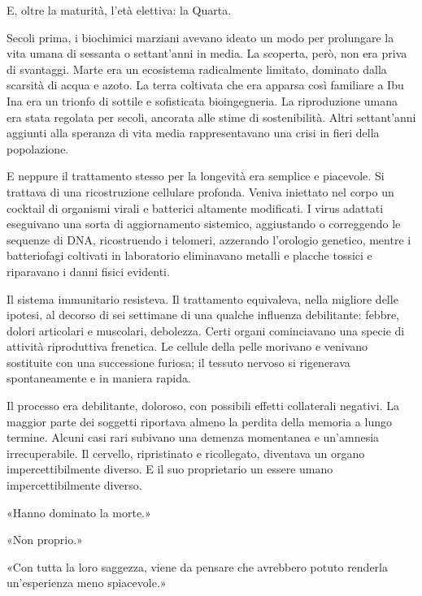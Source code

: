 E, oltre la maturità, l'età elettiva: la Quarta.

Secoli prima, i biochimici marziani avevano ideato un modo per
prolungare la vita umana di sessanta o settant'anni in media. La
scoperta, però, non era priva di svantaggi. Marte era un ecosistema
radicalmente limitato, dominato dalla scarsità di acqua e azoto. La
terra coltivata che era apparsa così familiare a Ibu Ina era un trionfo
di sottile e sofisticata bioingegneria. La riproduzione umana era stata
regolata per secoli, ancorata alle stime di sostenibilità. Altri
settant'anni aggiunti alla speranza di vita media rappresentavano una
crisi in fieri della popolazione.

E neppure il trattamento stesso per la longevità era semplice e
piacevole. Si trattava di una ricostruzione cellulare profonda. Veniva
iniettato nel corpo un cocktail di organismi virali e batterici
altamente modificati. I virus adattati eseguivano una sorta di
aggiornamento sistemico, aggiustando o correggendo le sequenze di DNA,
ricostruendo i telomeri, azzerando l'orologio genetico, mentre i
batteriofagi coltivati in laboratorio eliminavano metalli e placche
tossici e riparavano i danni fisici evidenti.

Il sistema immunitario resisteva. Il trattamento equivaleva, nella
migliore delle ipotesi, al decorso di sei settimane di una qualche
influenza debilitante: febbre, dolori articolari e muscolari, debolezza.
Certi organi cominciavano una specie di attività riproduttiva frenetica.
Le cellule della pelle morivano e venivano sostituite con una
successione furiosa; il tessuto nervoso si rigenerava spontaneamente e
in maniera rapida.

Il processo era debilitante, doloroso, con possibili effetti collaterali
negativi. La maggior parte dei soggetti riportava almeno la perdita
della memoria a lungo termine. Alcuni casi rari subivano una demenza
momentanea e un'amnesia irrecuperabile. Il cervello, ripristinato e
ricollegato, diventava un organo impercettibilmente diverso. E il suo
proprietario un essere umano impercettibilmente diverso.

«Hanno dominato la morte.»

«Non proprio.»

«Con tutta la loro saggezza, viene da pensare che avrebbero potuto
renderla un'esperienza meno spiacevole.»

